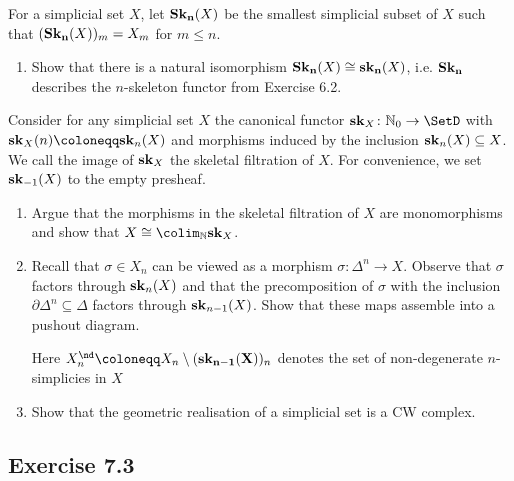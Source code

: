 For a simplicial set $ X $, let $\bold{ Sk_n } ( X ) $ be the smallest simplicial subset of $ X $ such that $ ( \bold{ Sk_n } ( X ) )_m = X_m $ for $ m \leq n $.

\begin{enumerate}
    \item 
    Show that there is a natural isomorphism $ \bold { Sk_n } ( X ) \cong \bold { sk_n } ( X ) $, i.e. $ \bold{ Sk_n } $ describes the $n$-skeleton functor from Exercise 6.2.
\end{enumerate}

Consider for any simplicial set $ X $ the canonical functor $ \bold{ sk }_X \colon \mathbb{ N }_0 \to \SetD $ with $ \bold{ sk }_X ( n ) \coloneqq \bold{ sk }_n ( X ) $ and morphisms induced by the inclusion $ \bold{ sk }_n ( X ) \subseteq X $.
We call the image of $ \bold{ sk }_X $ the skeletal filtration of $ X $. 
For convenience, we set $ \bold{ sk }_{-1} ( X ) $ to the empty presheaf.

\begin{enumerate}[label=(\alph*), resume]
    \item 
    Argue that the morphisms in the skeletal filtration of $ X $ are monomorphisms and show that $ X \cong \colim_{ \mathbb{ N } } \bold{ sk }_X$.

    \item 
    Recall that $ \sigma \in X_n $ can be viewed as a morphism $ \sigma : \Delta^n \to X $.
    Observe that $ \sigma $ factors through $ \bold{ sk }_n ( X ) $ and that the precomposition of $ \sigma $ with the inclusion $ \partial \Delta^n \subseteq \Delta $ factors through $ \bold{ sk }_{n-1} ( X ) $.
    Show that these maps assemble into a pushout diagram.
    Here $X_n^{\nd} \coloneqq X_n \setminus ( \bold{ sk_{n-1} ( X ) })_n$ 
    denotes the set of non-degenerate $n$-simplicies in $ X$

    \item   
    Show that the geometric realisation of a simplicial set is a CW complex.
\end{enumerate}

\subsection{Exercise 7.3}


